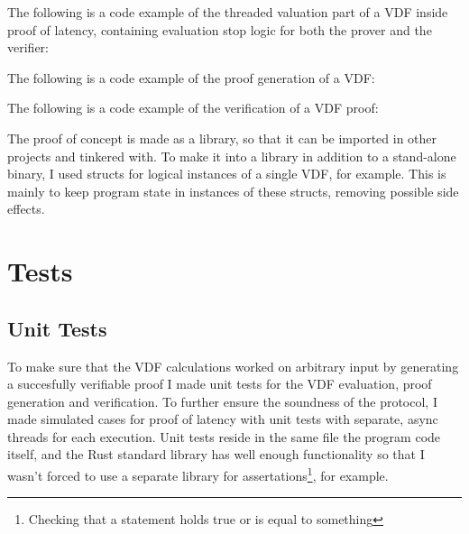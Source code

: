 The following is a code example of the threaded valuation part of a VDF inside proof of latency, containing evaluation stop logic for both the prover and the verifier:

The following is a code example of the proof generation of a VDF:

The following is a code example of the verification of a VDF proof:

The proof of concept is made as a library, so that it can be imported in other projects and tinkered with. To make it into a library in addition to a stand-alone binary, I used structs for logical instances of a single VDF, for example. This is mainly to keep program state in instances of these structs, removing possible side effects.


\section{Tests}
\subsection{Unit Tests}
To make sure that the VDF calculations worked on arbitrary input by generating a succesfully verifiable proof I made unit tests for the VDF evaluation, proof generation and verification. To further ensure the soundness of the protocol, I made simulated cases for proof of latency with unit tests with separate, async threads for each execution. Unit tests reside in the same file the program code itself, and the Rust standard library has well enough functionality so that I wasn't forced to use a separate library for assertations\footnote{Checking that a statement holds true or is equal to something}, for example.

